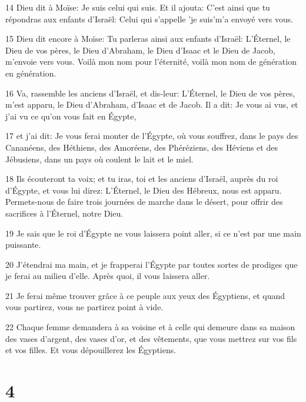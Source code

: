 \par 14 Dieu dit à Moïse: Je suis celui qui suis. Et il ajouta: C'est ainsi que tu répondras aux enfants d'Israël: Celui qui s'appelle 'je suis'm'a envoyé vers vous.
\par 15 Dieu dit encore à Moïse: Tu parleras ainsi aux enfants d'Israël: L'Éternel, le Dieu de vos pères, le Dieu d'Abraham, le Dieu d'Isaac et le Dieu de Jacob, m'envoie vers vous. Voilà mon nom pour l'éternité, voilà mon nom de génération en génération.
\par 16 Va, rassemble les anciens d'Israël, et dis-leur: L'Éternel, le Dieu de vos pères, m'est apparu, le Dieu d'Abraham, d'Isaac et de Jacob. Il a dit: Je vous ai vus, et j'ai vu ce qu'on vous fait en Égypte,
\par 17 et j'ai dit: Je vous ferai monter de l'Égypte, où vous souffrez, dans le pays des Cananéens, des Héthiens, des Amoréens, des Phéréziens, des Héviens et des Jébusiens, dans un pays où coulent le lait et le miel.
\par 18 Ils écouteront ta voix; et tu iras, toi et les anciens d'Israël, auprès du roi d'Égypte, et vous lui direz: L'Éternel, le Dieu des Hébreux, nous est apparu. Permets-nous de faire trois journées de marche dans le désert, pour offrir des sacrifices à l'Éternel, notre Dieu.
\par 19 Je sais que le roi d'Égypte ne vous laissera point aller, si ce n'est par une main puissante.
\par 20 J'étendrai ma main, et je frapperai l'Égypte par toutes sortes de prodiges que je ferai au milieu d'elle. Après quoi, il vous laissera aller.
\par 21 Je ferai même trouver grâce à ce peuple aux yeux des Égyptiens, et quand vous partirez, vous ne partirez point à vide.
\par 22 Chaque femme demandera à sa voisine et à celle qui demeure dans sa maison des vases d'argent, des vases d'or, et des vêtements, que vous mettrez sur vos fils et vos filles. Et vous dépouillerez les Égyptiens.

\chapter{4}

